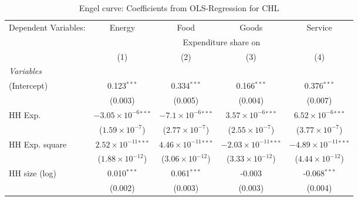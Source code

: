 
\begin{table}[htbp!]
   \centering
   \small
   \begin{adjustbox}{width = 1\textwidth, max height = 0.95\textheight, center}
      \begin{threeparttable}[b]
         \caption{\label{tab:Engel_parametric_CHL} Engel curve: Coefficients from OLS-Regression for CHL}
         \begin{tabular}{lcccc}
            \tabularnewline \midrule \midrule
            Dependent Variables: & Energy                         & Food                           & Goods                           & Service\\  
             & \multicolumn{4}{c}{Expenditure share on} \\ 
                                 & (1)                            & (2)                            & (3)                             & (4)\\  
            \midrule
            \emph{Variables}\\
            (Intercept)          & 0.123$^{***}$                  & 0.334$^{***}$                  & 0.166$^{***}$                   & 0.376$^{***}$\\   
                                 & (0.003)                        & (0.005)                        & (0.004)                         & (0.007)\\   
            HH Exp.              & $-3.05\times 10^{-6}$$^{***}$  & $-7.1\times 10^{-6}$$^{***}$   & $3.57\times 10^{-6}$$^{***}$    & $6.52\times 10^{-6}$$^{***}$\\    
                                 & ($1.59\times 10^{-7}$)         & ($2.77\times 10^{-7}$)         & ($2.55\times 10^{-7}$)          & ($3.77\times 10^{-7}$)\\    
            HH Exp. square       & $2.52\times 10^{-11}$$^{***}$  & $4.46\times 10^{-11}$$^{***}$  & $-2.03\times 10^{-11}$$^{***}$  & $-4.89\times 10^{-11}$$^{***}$\\    
                                 & ($1.88\times 10^{-12}$)        & ($3.06\times 10^{-12}$)        & ($3.33\times 10^{-12}$)         & ($4.44\times 10^{-12}$)\\    
            HH size (log)        & 0.010$^{***}$                  & 0.061$^{***}$                  & -0.003                          & -0.068$^{***}$\\   
                                 & (0.002)                        & (0.003)                        & (0.003)                         & (0.004)\\   

\end{tabular}
\end{threeparttable}
\end{adjustbox}
\end{table}
